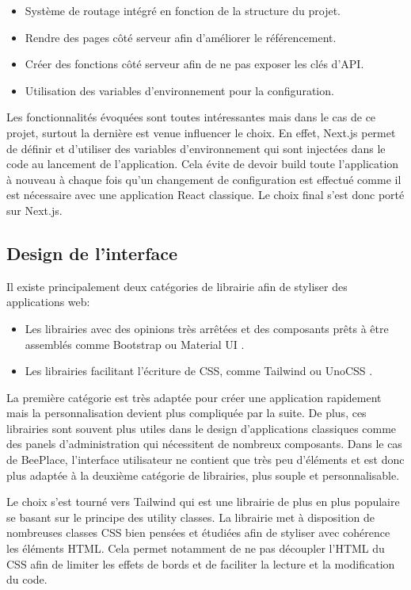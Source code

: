 \begin{itemize}
  \item Système de routage intégré en fonction de la structure du projet.
  \item Rendre des pages côté serveur afin d'améliorer le référencement.
  \item Créer des fonctions côté serveur afin de ne pas exposer les clés d'API.
  \item Utilisation des variables d'environnement pour la configuration.
\end{itemize}

Les fonctionnalités évoquées sont toutes intéressantes mais dans le cas de ce projet, surtout la dernière est venue influencer le choix. En effet, Next.js permet de définir et d'utiliser des variables d'environnement qui sont injectées dans le code au lancement de l'application. Cela évite de devoir build toute l'application à nouveau à chaque fois qu'un changement de configuration est effectué comme il est nécessaire avec une application React classique. Le choix final s'est donc porté sur Next.js.

\subsection{Design de l'interface}

Il existe principalement deux catégories de librairie afin de styliser des applications web:

\begin{itemize}
  \item Les librairies avec des opinions très arrêtées et des composants prêts à être assemblés comme Bootstrap \cite{bootstrap} ou Material UI \cite{mui}.
  \item Les librairies facilitant l'écriture de CSS, comme Tailwind \cite{tailwindcss} ou UnoCSS \cite{unocss}.
\end{itemize}

La première catégorie est très adaptée pour créer une application rapidement mais la personnalisation devient plus compliquée par la suite. De plus, ces librairies sont souvent plus utiles dans le design d'applications classiques comme des panels d'administration qui nécessitent de nombreux composants. Dans le cas de BeePlace, l'interface utilisateur ne contient que très peu d'éléments et est donc plus adaptée à la deuxième catégorie de librairies, plus souple et personnalisable.

Le choix s'est tourné vers Tailwind qui est une librairie de plus en plus populaire se basant sur le principe des utility classes. La librairie met à disposition de nombreuses classes CSS bien pensées et étudiées afin de styliser avec cohérence les éléments HTML. Cela permet notamment de ne pas découpler l'HTML du CSS afin de limiter les effets de bords et de faciliter la lecture et la modification du code.

